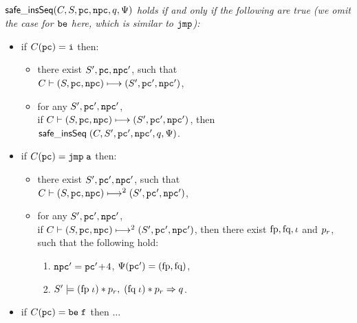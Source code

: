 \begin{definition}
	\em
	\label{def:Safety Instruction Sequence Judgment}
    \mbox{}\\
	$\safetins(\code, \state, \pc, \npc, \astQ, \Psi)$ holds if
    and only if the following are true (we omit the case
	for $\be$ here, which is similar to $\jmp$):
	
	\small
	\begin{itemize}
		\item if $\code(\pc) = \simplins$ then:
		\begin{itemize}
			\item
			there exist $\state', \pc, \npc'$, such that \\
			$\ptrans{(\state, \pc, \npc)}{(\state', \pc', \npc')}$,
			
			\item
			for any $\state', \pc', \npc'$, \\ if
			$\ptrans{(\state, \pc, \npc)}{(\state', \pc', \npc')}$, then \\
			$\safetins \; (\code, \state', \pc', \npc', \astQ, \Psi)$. 
		\end{itemize}
		
		\item if $\code(\pc) = \jmp \; \aexp$ then:
		\begin{itemize}
			\item there exist $\state', \pc', \npc'$, such that
			\\
			$\multiptrans{2}{(\state, \pc, \npc)}
				{(\state', \pc', \npc')}$,
			
			\item for any $\state', \pc', \npc'$, \\ if
			$\multiptrans{2}{(\state, \pc, \npc)}{(\state', \pc', \npc')}$,
			then there exist $\specpre, \specpost, \lgvl$ and $\pr$,
			such that the following hold:
			\begin{enumerate}[(1)]
                \item %
                      $\npc' = \pc' \!+\! 4$,
                      $\Psi (\pc') = (\specpre, \specpost)$,

				
				\item $\asrtmodel{S'}{(\specpre \; \lgvl) * \pr}, \; (\specpost \; \lgvl) * \pr \Rightarrow q$.
            \end{enumerate}
		\end{itemize}

		\item if $\code(\pc) = \be \; \lab{}$ then $\dots$ 
		

\end{itemize}
\end{definition}
